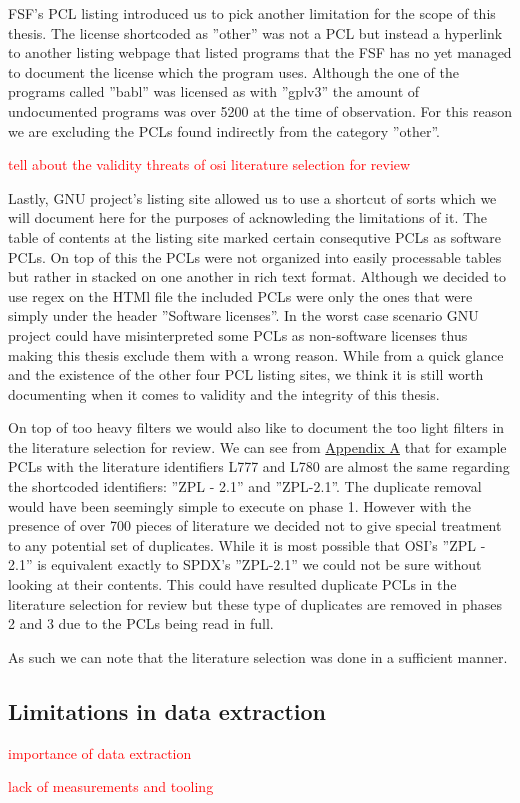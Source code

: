 FSF's PCL listing introduced us to pick another limitation for the scope of this thesis. The license shortcoded as ''other'' was not a PCL but instead a hyperlink to another listing webpage that listed programs that the FSF has no yet managed to document the license which the program uses. Although the one of the programs called ''babl'' was licensed as with ''gplv3'' the amount of undocumented programs was over 5200 at the time of observation. For this reason we are excluding the PCLs found indirectly from the category ''other''.

\textcolor{red}{tell about the validity threats of osi literature selection for review}

Lastly, GNU project's listing site allowed us to use a shortcut of sorts which we will document here for the purposes of acknowleding the limitations of it. The table of contents at the listing site marked certain consequtive PCLs as software PCLs. On top of this the PCLs were not organized into easily processable tables but rather in stacked on one another in rich text format. Although we decided to use regex on the HTMl file the included PCLs were only the ones that were simply under the header ''Software licenses''. In the worst case scenario GNU project could have misinterpreted some PCLs as non-software licenses thus making this thesis exclude them with a wrong reason. While from a quick glance and the existence of the other four PCL listing sites, we think it is still worth documenting when it comes to validity and the integrity of this thesis.

On top of too heavy filters we would also like to document the too light filters in the literature selection for review. We can see from \hyperref[appendix:a]{Appendix A} that for example PCLs with the literature identifiers L777 and L780 are almost the same regarding the shortcoded identifiers: ''ZPL - 2.1'' and ''ZPL-2.1''. The duplicate removal would have been seemingly simple to execute on phase 1. However with the presence of over 700 pieces of literature we decided not to give special treatment to any potential set of duplicates. While it is most possible that OSI's ''ZPL - 2.1'' is equivalent exactly to SPDX's ''ZPL-2.1'' we could not be sure without looking at their contents. This could have resulted duplicate PCLs in the literature selection for review but these type of duplicates are removed in phases 2 and 3 due to the PCLs being read in full.

As such we can note that the literature selection was done in a sufficient manner.

\subsection{Limitations in data extraction}

\textcolor{red}{importance of data extraction}

\textcolor{red}{lack of measurements and tooling}